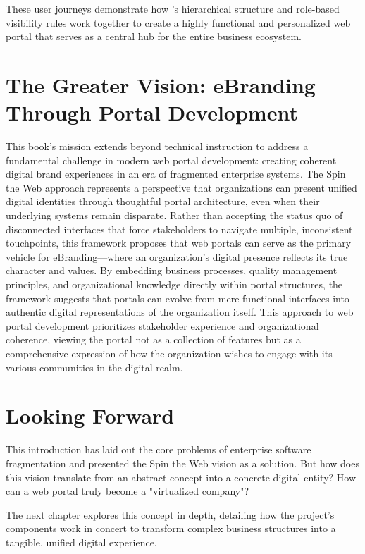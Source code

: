 These user journeys demonstrate how \wbdl{}'s hierarchical structure and role-based visibility rules work together to create a highly functional and personalized web portal that serves as a central hub for the entire business ecosystem.

\section{The Greater Vision: eBranding Through Portal Development}
\label{sec:ebranding-vision}

This book's mission extends beyond technical instruction to address a fundamental challenge in modern web portal development: creating coherent digital brand experiences in an era of fragmented enterprise systems. The Spin the Web approach represents a perspective that organizations can present unified digital identities through thoughtful portal architecture, even when their underlying systems remain disparate. Rather than accepting the status quo of disconnected interfaces that force stakeholders to navigate multiple, inconsistent touchpoints, this framework proposes that web portals can serve as the primary vehicle for eBranding—where an organization's digital presence reflects its true character and values. By embedding business processes, quality management principles, and organizational knowledge directly within portal structures, the framework suggests that portals can evolve from mere functional interfaces into authentic digital representations of the organization itself. This approach to web portal development prioritizes stakeholder experience and organizational coherence, viewing the portal not as a collection of features but as a comprehensive expression of how the organization wishes to engage with its various communities in the digital realm.

\section{Looking Forward}
\label{sec:looking-forward}

This introduction has laid out the core problems of enterprise software fragmentation and presented the Spin the Web vision as a solution. But how does this vision translate from an abstract concept into a concrete digital entity? How can a web portal truly become a "virtualized company"?

The next chapter explores this concept in depth, detailing how the project's components work in concert to transform complex business structures into a tangible, unified digital experience.

